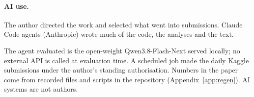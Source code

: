 \paragraph{AI use.} The author directed the work and selected what went into submissions. Claude Code agents (Anthropic) wrote much of the code, the analyses and the text.

\noindent The agent evaluated is the open-weight Qwen3.8-Flash-Next served locally; no external API is called at evaluation time. A scheduled job made the daily Kaggle submissions under the author's standing authorisation. Numbers in the paper come from recorded files and scripts in the repository (Appendix~\ref{app:regen}). AI systems are not authors. %
